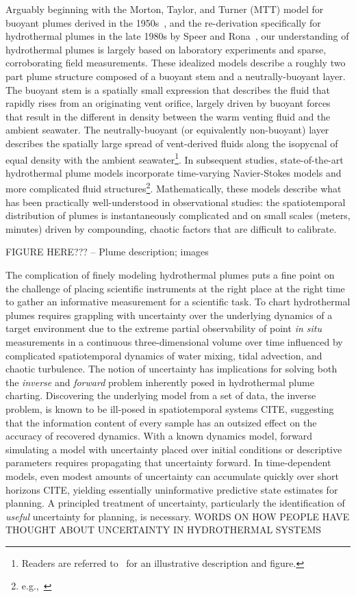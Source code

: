 Arguably beginning with the Morton, Taylor, and Turner (MTT) model for buoyant plumes derived in the 1950s~\autocite{morton1956turbulent}, and the re-derivation specifically for hydrothermal plumes in the late 1980s by Speer and Rona~\autocite{speer1989model}, our understanding of hydrothermal plumes is largely based on laboratory experiments and sparse, corroborating field measurements.
These idealized models describe a roughly two part plume structure composed of a buoyant stem and a neutrally-buoyant layer. 
The buoyant stem is a spatially small expression that describes the fluid that rapidly rises from an originating vent orifice, largely driven by buoyant forces that result in the different in density between the warm venting fluid and the ambient seawater.
The neutrally-buoyant (or equivalently non-buoyant) layer describes the spatially large spread of vent-derived fluids along the isopycnal of equal density with the ambient seawater\footnote{Readers are referred to~\autocite{yoerger2007autonomous} for an illustrative description and figure.}. 
In subsequent studies, state-of-the-art hydrothermal plume models incorporate time-varying Navier-Stokes models and more complicated fluid structures\footnote{e.g.,~\autocite{lavelle2013turbulent,xu2012deep}}.
Mathematically, these models describe what has been practically well-understood in observational studies: the spatiotemporal distribution of plumes is instantaneously complicated and on small scales (meters, minutes) driven by compounding, chaotic factors that are difficult to calibrate.


FIGURE HERE??? -- Plume description; images


The complication of finely modeling hydrothermal plumes puts a fine point on the challenge of placing scientific instruments at the right place at the right time to gather an informative measurement for a scientific task.
To chart hydrothermal plumes requires grappling with uncertainty over the underlying dynamics of a target environment due to the extreme partial observability of point \emph{in situ} measurements in a continuous three-dimensional volume over time influenced by complicated spatiotemporal dynamics of water mixing, tidal advection, and chaotic turbulence.
The notion of uncertainty has implications for solving both the \emph{inverse} and \emph{forward} problem inherently posed in hydrothermal plume charting.
Discovering the underlying model from a set of data, the inverse problem, is known to be ill-posed in spatiotemporal systems CITE, suggesting that the information content of every sample has an outsized effect on the accuracy of recovered dynamics.
With a known dynamics model, forward simulating a model with uncertainty placed over initial conditions or descriptive parameters requires propagating that uncertainty forward.
In time-dependent models, even modest amounts of uncertainty can accumulate quickly over short horizons CITE, yielding essentially uninformative predictive state estimates for planning.
A principled treatment of uncertainty, particularly the identification of \emph{useful} uncertainty for planning, is necessary. 
WORDS ON HOW PEOPLE HAVE THOUGHT ABOUT UNCERTAINTY IN HYDROTHERMAL SYSTEMS



